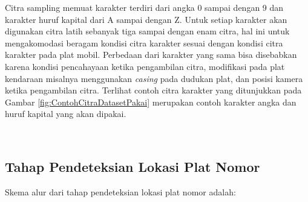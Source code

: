 \noindent Citra sampling memuat karakter terdiri dari angka 0 sampai dengan 9 dan karakter huruf kapital dari A sampai dengan Z. Untuk setiap karakter akan digunakan citra latih sebanyak tiga sampai dengan enam citra, hal ini untuk mengakomodasi beragam kondisi citra karakter sesuai dengan kondisi citra karakter pada plat mobil. Perbedaan dari karakter yang sama bisa disebabkan karena kondisi pencahayaan ketika pengambilan citra, modifikasi pada plat kendaraan misalnya menggunakan \textit{casing} pada dudukan plat, dan posisi kamera ketika pengambilan citra. Terlihat contoh citra karakter yang ditunjukkan pada Gambar \ref{fig:ContohCitraDatasetPakai} merupakan contoh karakter angka dan huruf kapital yang akan dipakai.

\begin{adjustbox}{width=1\textwidth}
	\noindent\begin{minipage}{\linewidth}
		\label{fig:ContohCitraDatasetPakai}
	\end{minipage}
\end{adjustbox}
\\

\subsection{Tahap Pendeteksian Lokasi Plat Nomor}
\noindent Skema alur dari tahap pendeteksian lokasi plat nomor adalah:

